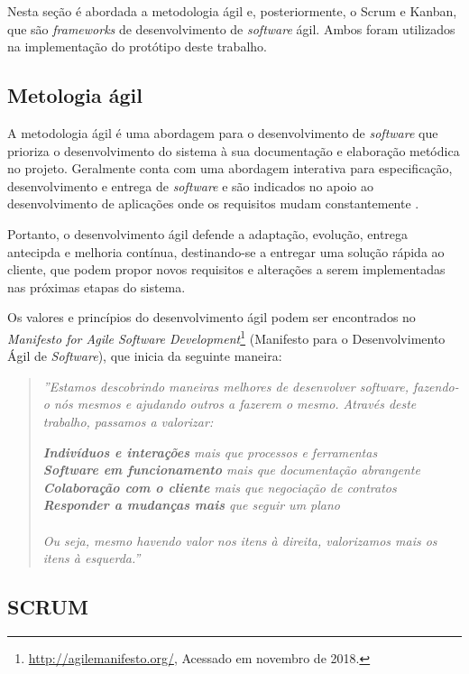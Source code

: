 Nesta seção é abordada a metodologia ágil e, posteriormente, o Scrum e Kanban, que são \textit{frameworks} de desenvolvimento de \textit{software} ágil. Ambos foram utilizados na implementação do protótipo deste trabalho.


\subsection{Metologia ágil}
\label{fundSWAgil}

A metodologia ágil é uma abordagem para o desenvolvimento de \textit{software} que prioriza o desenvolvimento do sistema à sua documentação e elaboração metódica no projeto. Geralmente conta com uma abordagem interativa para especificação, desenvolvimento e entrega de \textit{software} e são indicados no apoio ao desenvolvimento de aplicações onde os requisitos mudam constantemente \cite{sommerville}.

Portanto, o desenvolvimento ágil defende a adaptação, evolução, entrega antecipda e melhoria contínua, destinando-se a entregar uma solução rápida ao cliente, que podem propor novos requisitos e alterações a serem implementadas nas próximas etapas do sistema.

Os valores e princípios do desenvolvimento ágil podem ser encontrados no \textit{Manifesto for Agile Software Development}\footnote{\url{http://agilemanifesto.org/}, Acessado em novembro de 2018.} (Manifesto para o Desenvolvimento Ágil de \textit{Software}), que inicia da seguinte maneira:

\begin{quote}
    \textit{''Estamos descobrindo maneiras melhores de desenvolver software, fazendo-o nós mesmos e ajudando outros a 
    fazerem o mesmo. Através deste trabalho, passamos a valorizar:}
    
        \textit{\textbf{Indivíduos e interações} mais que processos e ferramentas \\
        \textbf{Software em funcionamento} mais que documentação abrangente \\
        \textbf{Colaboração com o cliente} mais que negociação de contratos \\
        \textbf{Responder a mudanças mais} que seguir um plano \\}
        \\
        \textit{Ou seja, mesmo havendo valor nos itens à direita, valorizamos mais os itens à esquerda.''}
\end{quote}


\subsection{SCRUM}
\label{fundSWSCRUM}

